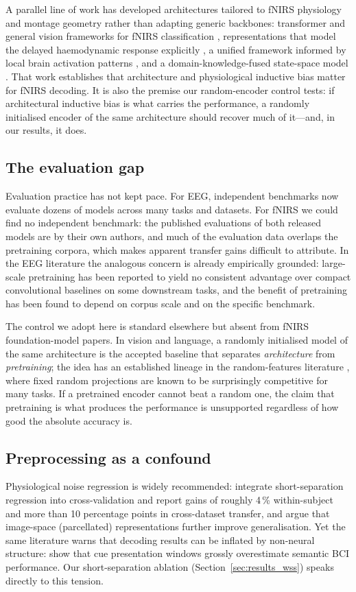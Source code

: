 A parallel line of work has developed architectures tailored to fNIRS physiology and montage
geometry rather than adapting generic backbones: transformer and general vision frameworks for
fNIRS classification \citep{wang2022transformer,wang2022vision}, representations that model the
delayed haemodynamic response explicitly \citep{wang2023rethinking}, a unified framework informed
by local brain activation patterns \citep{wang2026unified}, and a domain-knowledge-fused
state-space model \citep{wang2026dkssm}. That work establishes that architecture and
physiological inductive bias matter for fNIRS decoding. It is also the premise our random-encoder
control tests: if architectural inductive bias is what carries the performance, a randomly
initialised encoder of the same architecture should recover much of it---and, in our results,
it does.

\subsection{The evaluation gap}
Evaluation practice has not kept pace. For EEG, independent benchmarks now evaluate dozens of
models across many tasks and datasets. For fNIRS we could find no independent benchmark: the
published evaluations of both released models are by their own authors, and much of the
evaluation data overlaps the pretraining corpora, which makes apparent transfer gains difficult
to attribute. In the EEG literature the analogous concern is already empirically grounded:
large-scale pretraining has been reported to yield no consistent advantage over compact
convolutional baselines on some downstream tasks, and the benefit of pretraining has been found
to depend on corpus scale and on the specific benchmark.

The control we adopt here is standard elsewhere but absent from fNIRS foundation-model papers.
In vision and language, a randomly initialised model of the same architecture is the accepted
baseline that separates \emph{architecture} from \emph{pretraining}; the idea has an established
lineage in the random-features literature \citep{rahimi2007random}, where fixed random
projections are known to be surprisingly competitive for many tasks. If a pretrained encoder
cannot beat a random one, the claim that pretraining is what produces the performance is
unsupported regardless of how good the absolute accuracy is.

\subsection{Preprocessing as a confound}
Physiological noise regression is widely recommended: \citet{fischer2026density} integrate
short-separation regression into cross-validation and report gains of roughly 4\,\% within-subject
and more than 10 percentage points in cross-dataset transfer, and argue that image-space
(parcellated) representations further improve generalisation. Yet the same literature warns that
decoding results can be inflated by non-neural structure: \citet{rybar2024cue} show that cue
presentation windows grossly overestimate semantic BCI performance. Our short-separation ablation
(Section~\ref{sec:results_wss}) speaks directly to this tension.
